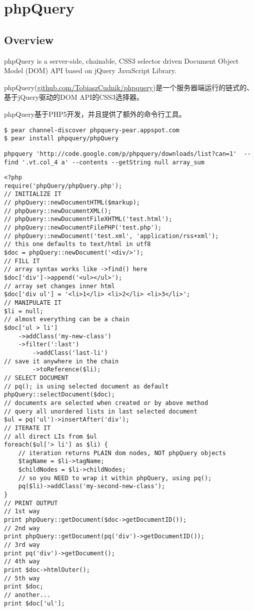 \part{phpQuery}

\chapter{Overview}


phpQuery is a server-side, chainable, CSS3 selector driven Document Object Model (DOM) API based on jQuery JavaScript Library.

phpQuery(\url{github.com/TobiaszCudnik/phpquery})是一个服务器端运行的链式的、基于jQuery驱动的DOM API的CSS3选择器。

phpQuery基于PHP5开发，并且提供了额外的命令行工具。

\begin{lstlisting}[langugae=PHP]
$ pear channel-discover phpquery-pear.appspot.com 
$ pear install phpquery/phpQuery
\end{lstlisting}





\begin{lstlisting}[langugae=bash]
phpquery 'http://code.google.com/p/phpquery/downloads/list?can=1'  --find '.vt.col_4 a' --contents --getString null array_sum
\end{lstlisting}



\begin{lstlisting}[langugae=bash]
<?php
require('phpQuery/phpQuery.php');
// INITIALIZE IT
// phpQuery::newDocumentHTML($markup);
// phpQuery::newDocumentXML();
// phpQuery::newDocumentFileXHTML('test.html');
// phpQuery::newDocumentFilePHP('test.php');
// phpQuery::newDocument('test.xml', 'application/rss+xml');
// this one defaults to text/html in utf8
$doc = phpQuery::newDocument('<div/>');
// FILL IT
// array syntax works like ->find() here
$doc['div']->append('<ul></ul>');
// array set changes inner html
$doc['div ul'] = '<li>1</li> <li>2</li> <li>3</li>';
// MANIPULATE IT
$li = null;
// almost everything can be a chain
$doc['ul > li']
	->addClass('my-new-class')
	->filter(':last')
		->addClass('last-li')
// save it anywhere in the chain
		->toReference($li);
// SELECT DOCUMENT
// pq(); is using selected document as default
phpQuery::selectDocument($doc);
// documents are selected when created or by above method
// query all unordered lists in last selected document
$ul = pq('ul')->insertAfter('div');
// ITERATE IT
// all direct LIs from $ul
foreach($ul['> li'] as $li) {
	// iteration returns PLAIN dom nodes, NOT phpQuery objects
	$tagName = $li->tagName;
	$childNodes = $li->childNodes;
	// so you NEED to wrap it within phpQuery, using pq();
	pq($li)->addClass('my-second-new-class');
}
// PRINT OUTPUT
// 1st way
print phpQuery::getDocument($doc->getDocumentID());
// 2nd way
print phpQuery::getDocument(pq('div')->getDocumentID());
// 3rd way
print pq('div')->getDocument();
// 4th way
print $doc->htmlOuter();
// 5th way
print $doc;
// another...
print $doc['ul'];
\end{lstlisting}




